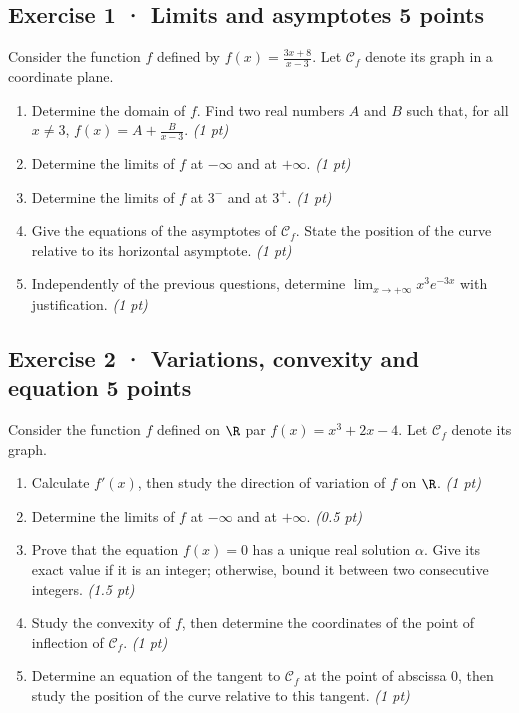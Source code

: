 \subsection*{Exercise 1 · Limits and asymptotes \hfill 5 points}Consider the function $f$ defined by $f(x)=\frac{3x+8}{x-3}$. Let $\mathcal C_f$ denote its graph in a coordinate plane.

\begin{enumerate}

\item Determine the domain of $f$. Find two real numbers $A$ and $B$ such that, for all $x\ne3$, $f(x)=A+\frac B{x-3}$. \hfill\textit{(1 pt)}

\item Determine the limits of $f$ at $-\infty$ and at $+\infty$. \hfill\textit{(1 pt)}

\item Determine the limits of $f$ at $3^-$ and at $3^+$. \hfill\textit{(1 pt)}

\item Give the equations of the asymptotes of $\mathcal C_f$. State the position of the curve relative to its horizontal asymptote. \hfill\textit{(1 pt)}

\item Independently of the previous questions, determine $\displaystyle\lim_{x\to+\infty}x^{3}e^{-3x}$ with justification. \hfill\textit{(1 pt)}

\end{enumerate}

\subsection*{Exercise 2 · Variations, convexity and equation \hfill 5 points}Consider the function $f$ defined on $\R$ par $f(x)=x^3+2x-4$. Let $\mathcal C_f$ denote its graph.

\begin{enumerate}

\item Calculate $f' (x)$, then study the direction of variation of $f$ on $\R$. \hfill\textit{(1 pt)}

\item Determine the limits of $f$ at $-\infty$ and at $+\infty$. \hfill\textit{(0.5 pt)}

\item Prove that the equation $f(x)=0$ has a unique real solution $\alpha$. Give its exact value if it is an integer; otherwise, bound it between two consecutive integers. \hfill\textit{(1.5 pt)}

\item Study the convexity of $f$, then determine the coordinates of the point of inflection of $\mathcal C_f$. \hfill\textit{(1 pt)}

\item Determine an equation of the tangent to $\mathcal C_f$ at the point of abscissa $0$, then study the position of the curve relative to this tangent. \hfill\textit{(1 pt)}

\end{enumerate}

